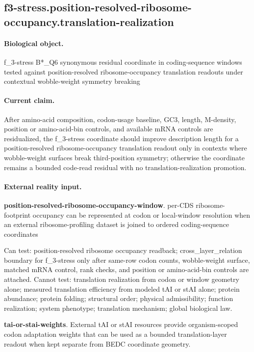 \subsection{f3-stress.position-resolved-ribosome-occupancy.translation-realization}

\paragraph{Biological object.} f\_3-stress B*\_Q6 synonymous residual coordinate in coding-sequence windows tested against position-resolved ribosome-occupancy translation readouts under contextual wobble-weight symmetry breaking

\paragraph{Current claim.} After amino-acid composition, codon-usage baseline, GC3, length, M-density, position or amino-acid-bin controls, and available mRNA controls are residualized, the f\_3-stress coordinate should improve description length for a position-resolved ribosome-occupancy translation readout only in contexts where wobble-weight surfaces break third-position symmetry; otherwise the coordinate remains a bounded code-read residual with no translation-realization promotion.

\paragraph{External reality input.}
\textbf{position-resolved-ribosome-occupancy-window}. per-CDS ribosome-footprint occupancy can be represented at codon or local-window resolution when an external ribosome-profiling dataset is joined to ordered coding-sequence coordinates

Can test: position-resolved ribosome occupancy readback; cross\_layer\_relation boundary for f\_3-stress only after same-row codon counts, wobble-weight surface, matched mRNA control, rank checks, and position or amino-acid-bin controls are attached. Cannot test: translation realization from codon or window geometry alone; measured translation efficiency from modeled tAI or stAI alone; protein abundance; protein folding; structural order; physical admissibility; function realization; system phenotype; translation mechanism; global biological law.

\textbf{tai-or-stai-weights}. External tAI or stAI resources provide organism-scoped codon adaptation weights that can be used as a bounded translation-layer readout when kept separate from BEDC coordinate geometry.

